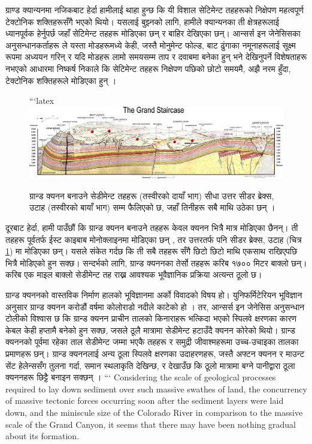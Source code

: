 \documentclass[10pt,twocolumn,letterpaper]{article}
\begin{document}
ग्राण्ड क्यान्यनमा नजिकबाट हेर्दा हामीलाई थाहा हुन्छ कि यी विशाल सेटिमेन्ट तहहरूको निक्षेपण महत्वपूर्ण टेक्टोनिक शक्तिहरूसँगै भएको थियो। यसलाई बुझ्नको लागि, हामीले क्यान्यनका ती क्षेत्रहरूलाई ध्यानपूर्वक हेर्नुपर्छ जहाँ सेटिमेन्ट तहहरू मोडिएका छन् र बाहिर देखिएका छन्। आन्सर्स इन जेनेसिसका अनुसन्धानकर्ताहरू \cite{42} ले यस्ता मोडहरूमध्ये केही, जस्तै मोनुमेन्ट फोल्ड, बाट ढुंगाका नमूनाहरूलाई सूक्ष्म रूपमा अध्ययन गरिन् र यदि मोडहरू लामो समयसम्म ताप र दवाबमा बनेका हुन् भने देखिनुपर्ने विशेषताहरू नभएको आधारमा निष्कर्ष निकाले कि सेटिमेन्ट तहहरू निक्षेपण पछिको छोटो समयमै, अझै नरम हुँदा, टेक्टोनिक शक्तिहरूले मोडिएका हुन् \cite{43}।

\begin{figure}
\begin{center}
```latex
\includegraphics[width=1\textwidth]{Grand_Staircase-big.jpg}
\end{center}
   \caption{ग्रान्ड क्यनन बनाउने सेडीमेन्ट तहहरू (तस्वीरको दायाँ भाग) सीधा उत्तर सीडर ब्रेक्स, उटाह (तस्वीरको बायाँ भाग) सम्म फैलिएको छ, जहाँ तिनीहरू सबै माथि उठेका छन् \cite{50}।}
\label{fig:4}
\end{figure}

दूरबाट हेर्दा, हामी पाउँछौं कि ग्रान्ड क्यनन बनाउने तहहरू केवल क्यनन भित्रै मात्र मोडिएका छैनन्। ती तहहरू पूर्वतर्फ ईस्ट काइबाब मोनोक्लाइनमा मोडिएका छन् \cite{46}, तर उत्तरतर्फ पनि सीडर ब्रेक्स, उटाह (चित्र \ref{fig:4}) मा मोडिएका छन्। यसले संकेत गर्दछ कि ती सबै तहहरू सँगै छिटो छिटो माथि एकसाथ राखिएपछि भित्रै मोडिएको हुन सक्छ। सन्दर्भको लागि, ग्रान्ड क्यननका तेर्सो तहहरू करिब १७०० मिटर बाक्लो छन्। करिब एक माइल बाक्लो सेडीमेन्ट तह राख्न आवश्यक भूवैज्ञानिक प्रक्रिया अत्यन्त ठूलो छ।

ग्रान्ड क्यननको वास्तविक निर्माण हालको भूविज्ञानमा अर्को विवादको विषय हो। युनिफर्मिटेरियन भूविज्ञान अनुसार ग्रान्ड क्यनन करोडौं वर्षमा कोलोराडो नदीले काटेको हो \cite{47}। तर, आन्सर्स इन जेनेसिस अनुसन्धान टोलीको विश्वास छ कि ग्रान्ड क्यनन प्राचीन तालको किनाराहरू भत्किदा भएको स्पिलवे क्षरणका कारण केबल केही हप्तामै बनेको हुन सक्छ, जसले ठूलै मात्रामा सेडीमेन्ट हटाउँदै क्यनन कोरेको थियो। ग्रान्ड क्यननको पूर्वमा रहेका ताल सेडीमेन्ट जम्मा भएकै तहहरू र समुद्री जीवाश्महरूमा उच्च-उचाइका तालका प्रमाणहरू छन्। ग्रान्ड क्यननलाई अन्य ठूला स्पिलवे क्षरणका उदाहरणहरू, जस्तै अफ्टन क्यनन र माउन्ट सेंट हेलेन्ससँग तुलना गर्दा, समान स्थलाकृति देखिन्छ, र देखाउँछ कि ठूलो मात्रामा बग्ने पानीद्वारा ठूला क्यननहरू छिट्टै बनाइन सक्छन् \cite{48}।
```
Considering the scale of geological processes required to lay down sediment over such massive swathes of land, the concurrency of massive tectonic forces occurring soon after the sediment layers were laid down, and the miniscule size of the Colorado River in comparison to the massive scale of the Grand Canyon, it seems that there may have been nothing gradual about its formation.
\end{document}
